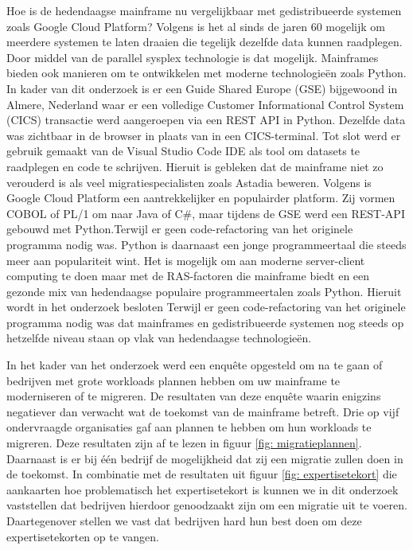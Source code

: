 Hoe is de hedendaagse mainframe nu vergelijkbaar met gedistribueerde systemen zoals Google Cloud Platform? Volgens \textcite{Sarkar2020} is het al sinds de jaren 60 mogelijk om meerdere systemen te laten draaien die tegelijk dezelfde data kunnen raadplegen. Door middel van de parallel sysplex technologie is dat mogelijk. Mainframes bieden ook manieren om te ontwikkelen met moderne technologieën zoals Python. In kader van dit onderzoek is er een Guide Shared Europe (GSE) bijgewoond in Almere, Nederland waar er een volledige Customer Informational Control System (CICS) transactie werd aangeroepen via een REST API in Python. Dezelfde data was zichtbaar in de browser in plaats van in een CICS-terminal. Tot slot werd er gebruik gemaakt van de Visual Studio Code IDE als tool om datasets te raadplegen en code te schrijven. Hieruit is gebleken dat de mainframe niet zo verouderd is als veel migratiespecialisten zoals Astadia beweren. Volgens \autocite{Astadia2021} is Google Cloud Platform een aantrekkelijker en populairder platform. Zij vormen COBOL of PL/1  om naar Java of C\#, maar tijdens de GSE werd een REST-API gebouwd met Python.Terwijl er geen code-refactoring van het originele programma nodig was. Python is daarnaast een jonge programmeertaal die steeds meer aan populariteit wint.  Het is mogelijk om aan moderne server-client computing te doen maar met de RAS-factoren die mainframe biedt en een gezonde mix van hedendaagse populaire programmeertalen zoals Python. Hieruit wordt in het onderzoek besloten Terwijl er geen code-refactoring van het originele programma nodig was dat mainframes en gedistribueerde systemen nog steeds op hetzelfde niveau staan op vlak van hedendaagse technologieën. 

In het kader van het onderzoek werd een enquête opgesteld om na te gaan of bedrijven met grote workloads plannen hebben om uw mainframe te moderniseren of te migreren. De resultaten van deze enquête waarin enigzins negatiever dan verwacht wat de toekomst van de mainframe betreft. Drie op vijf ondervraagde organisaties gaf aan plannen te hebben om hun workloads te migreren. Deze resultaten zijn af te lezen in figuur \ref{fig: migratieplannen}. Daarnaast is er bij één bedrijf de mogelijkheid dat zij een migratie zullen doen in de toekomst. In combinatie met de resultaten uit figuur \ref{fig: expertisetekort} die aankaarten hoe problematisch het expertisetekort is kunnen we in dit onderzoek vaststellen dat bedrijven hierdoor genoodzaakt zijn om een migratie uit te voeren. Daartegenover stellen we vast dat bedrijven hard hun best doen om deze expertisetekorten op te vangen. 

